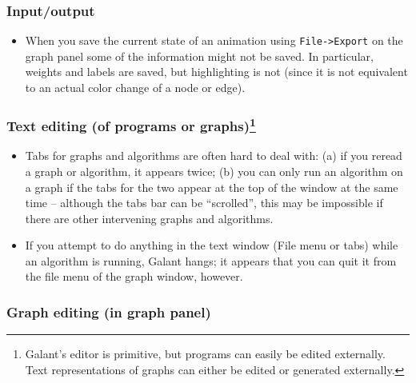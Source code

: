 
\subsubsection*{Input/output}

\begin{itemize}

\item
When you save the current state of an animation using \texttt{File->Export}
on the graph panel some of the information might not be saved.
In particular, weights and labels are saved, but highlighting is not (since it is not equivalent to an actual color change of a node or edge).

\end{itemize}

\subsubsection*{Text editing (of programs or graphs)\footnote{
Galant's editor  is primitive, but
programs can easily be edited externally.
Text representations of graphs can either be edited or generated externally.}}

\begin{itemize}

\item
Tabs for graphs and algorithms are often hard to deal with: (a) if you reread
a graph or algorithm, it appears twice; (b) you can only run an algorithm on a graph if the tabs for the two appear at the top of the window at the same time
-- although the tabs bar can be ``scrolled'',
this may be impossible if there are other intervening graphs and algorithms.

\item If you attempt to do anything in the text window (File menu or tabs)
  while an algorithm is running, Galant hangs; it appears that you can quit it from
the file menu of the graph window, however.

\end{itemize}

\subsubsection*{Graph editing (in graph panel)}

